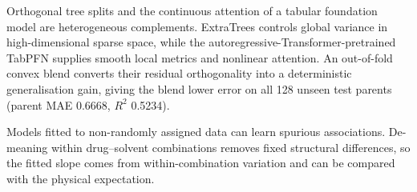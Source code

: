 Orthogonal tree splits and the continuous attention of a tabular foundation model are heterogeneous complements. ExtraTrees controls global variance in high-dimensional sparse space, while the autoregressive-Transformer-pretrained TabPFN supplies smooth local metrics and nonlinear attention. An out-of-fold convex blend converts their residual orthogonality into a deterministic generalisation gain, giving the blend lower error on all 128 unseen test parents (parent MAE 0.6668, $R^2$ 0.5234).

Models fitted to non-randomly assigned data can learn spurious associations. De-meaning within drug--solvent combinations removes fixed structural differences, so the fitted slope comes from within-combination variation and can be compared with the physical expectation.
